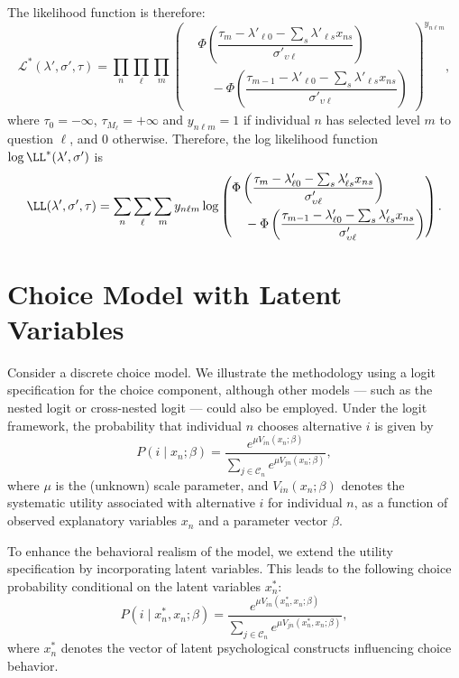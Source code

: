 \documentclass[12pt,a4paper]{article}
\begin{document}
The likelihood function is therefore:
\[
\mathcal{L}^*(\lambda', \sigma', \tau) = 
\prod_n \prod_\ell \prod_m 
\left(
\begin{aligned}
&\Phi\left(
\dfrac{
\tau_m - \lambda'_{\ell 0} - \sum_s \lambda'_{\ell s} x_{ns}
}{
\sigma'_{\upsilon \ell}
}
\right) \\
&\quad - \Phi\left(
\dfrac{
\tau_{m-1} - \lambda'_{\ell 0} - \sum_s \lambda'_{\ell s} x_{ns}
}{
\sigma'_{\upsilon \ell}
}
\right)
\end{aligned}
\right)^{y_{n\ell m}},
\]
where $\tau_0=-\infty$, $\tau_{M_\ell}=+\infty$ and $y_{n\ell m}=1$ if individual $n$ has selected level $m$ to question $\ell$, and 0 otherwise. Therefore, the log likelihood function $\log \LL^*(\lambda', \sigma')$ is 
\begin{equation}
  \label{eq:loglikelihood}
\LL(\lambda', \sigma', \tau) = 
\sum_n \sum_\ell \sum_m y_{n\ell m}\log 
\left(
\begin{aligned}
&\Phi\left(
\dfrac{
\tau_m - \lambda'_{\ell 0} - \sum_s \lambda'_{\ell s} x_{ns}
}{
\sigma'_{\upsilon \ell}
}
\right) \\
&\quad - \Phi\left(
\dfrac{
\tau_{m-1} - \lambda'_{\ell 0} - \sum_s \lambda'_{\ell s} x_{ns}
}{
\sigma'_{\upsilon \ell}
}
\right)
\end{aligned}
\right).
\end{equation}

\section{Choice Model with Latent Variables}

Consider a discrete choice model. We illustrate the methodology using a logit specification for the choice component, although other models --- such as the nested logit or cross-nested logit --- could also be employed. Under the logit framework, the probability that individual \( n \) chooses alternative \( i \) is given by
\begin{equation}
  \label{eq:logit}
  P(i \mid x_n; \beta) = \frac{e^{\mu V_{in}(x_n; \beta)}}{\sum_{j \in \mathcal{C}_n} e^{\mu V_{jn}(x_n; \beta)}},
\end{equation}
where \( \mu \) is the (unknown) scale parameter, and \( V_{in}(x_n; \beta) \) denotes the systematic utility associated with alternative \( i \) for individual \( n \), as a function of observed explanatory variables \( x_n \) and a parameter vector \( \beta \).

To enhance the behavioral realism of the model, we extend the utility specification by incorporating latent variables. This leads to the following choice probability conditional on the latent variables \( x_n^* \):
\begin{equation}
  \label{eq:choice_latent}
  P(i \mid x_n^*, x_n; \beta) = \frac{e^{\mu V_{in}(x_n^*, x_n; \beta)}}{\sum_{j \in \mathcal{C}_n} e^{\mu V_{jn}(x_n^*, x_n; \beta)}},
\end{equation}
where \( x_n^* \) denotes the vector of latent psychological constructs influencing choice behavior.
\end{document}
